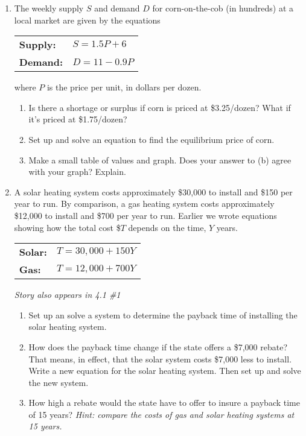 \begin{enumerate}
\item The weekly supply $S$ and demand $D$ for corn-on-the-cob (in hundreds) at a local market are given by the equations 
\begin{center}
\begin{tabular} {ll}
\textbf{Supply:} & $S = 1.5P+6$ \\
\textbf{Demand:} & $D= 11 - 0.9P$ \\ 
\end{tabular}
\end{center} 
where $P$ is the price per unit, in dollars per dozen.
\begin{enumerate}
\item Is there a shortage or surplus if corn is priced at \$3.25/dozen?  What if it's priced at \$1.75/dozen?
\item Set up and solve an equation to find the equilibrium price of corn.
\item Make a small table of values and graph.  Does your answer to (b) agree with your graph?  Explain.
\end{enumerate}

\item A solar heating system costs approximately \$30,000 to install and \$150 per year to run.  By comparison, a gas heating system costs approximately \$12,000 to install and \$700 per year to run.   Earlier we wrote equations showing how the total cost \$$T$ depends on the time, $Y$ years.
\begin{center}
\begin{tabular} {ll}
\textbf{Solar:} & $T  =30,000 + 150Y$\\
\textbf{Gas:} & $T  = 12,000 + 700Y$ \\ 
\end{tabular}
\end{center}

\hfill \emph{Story also appears in 4.1 \#1}
\begin{enumerate}
\item Set up an solve a system to determine the payback time of installing the solar heating system.
\item How does the payback time change if the state offers a \$7,000 rebate?  That means, in effect, that the solar system costs \$7,000 less to install. Write a new equation for the solar heating system.  Then set up and solve the new system.
\item How high a rebate would the state have to offer to insure a payback time of 15 years?  \emph{Hint:  compare the costs of gas and solar heating systems at 15 years.}
\end{enumerate}

\end{enumerate}
